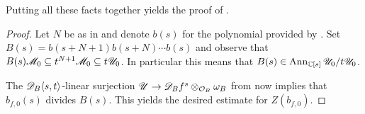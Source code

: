 Putting all these facts together yields the proof of .
\begin{proof}
  Let $N$ be as in  and denote $b(s)$ for the polynomial provided by .
  Set $B(s) = b(s+N+1)b(s+N)\cdots b(s)$ and observe that $B(s)\mathscr{M}_0 \subseteq t^{N+1}\mathscr{M}_0 \subseteq t\mathscr{U}_0$.
  In particular this means that $B(s) \in \operatorname{Ann}_{\mathbb{C}[s]} \mathscr{U}_0 / t\mathscr{U}_0$.

  The $\mathscr{D}_B\langle s,t\rangle$-linear surjection $\mathscr{U} \to \mathscr{D}_B f^s \otimes_{\mathcal{O}_B} \omega_B$ from  now implies that $b_{f,0}(s)$ divides $B(s)$.
  This yields the desired estimate for $Z(b_{f,0})$.
\end{proof}
